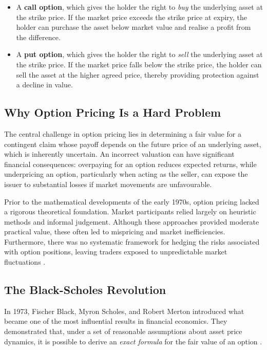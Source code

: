 \documentclass[12pt]{article}
\begin{document}
\begin{itemize}[leftmargin=2em, itemsep=4pt]
\item A \textbf{call option}, which gives the holder the right to \textit{buy} the underlying asset at the strike price. If the market price exceeds the strike price at expiry, the holder can purchase the asset below market value and realise a profit from the difference.

\item A \textbf{put option}, which gives the holder the right to \textit{sell} the underlying asset at the strike price. If the market price falls below the strike price, the holder can sell the asset at the higher agreed price, thereby providing protection against a decline in value.
\end{itemize}

\subsection{Why Option Pricing Is a Hard Problem}
The central challenge in option pricing lies in determining a fair value for a contingent claim whose payoff depends on the future price of an underlying asset, which is inherently uncertain. An incorrect valuation can have significant financial consequences: overpaying for an option reduces expected returns, while underpricing an option, particularly when acting as the seller, can expose the issuer to substantial losses if market movements are unfavourable.

Prior to the mathematical developments of the early 1970s, option pricing lacked a rigorous theoretical foundation. Market participants relied largely on heuristic methods and informal judgement. Although these approaches provided moderate practical value, these often led to mispricing and market inefficiencies. Furthermore, there was no systematic framework for hedging the risks associated with option positions, leaving traders exposed to unpredictable market fluctuations \cite{dotsis2025option}.

\subsection{The Black-Scholes Revolution}

In 1973, Fischer Black, Myron Scholes, and Robert Merton introduced what became one of the most influential results in financial economics. They demonstrated that, under a set of reasonable assumptions about asset price dynamics, it is possible to derive an \textit{exact formula} for the fair value of an option \cite{black1973pricing, merton1973theory}.
\end{document}
